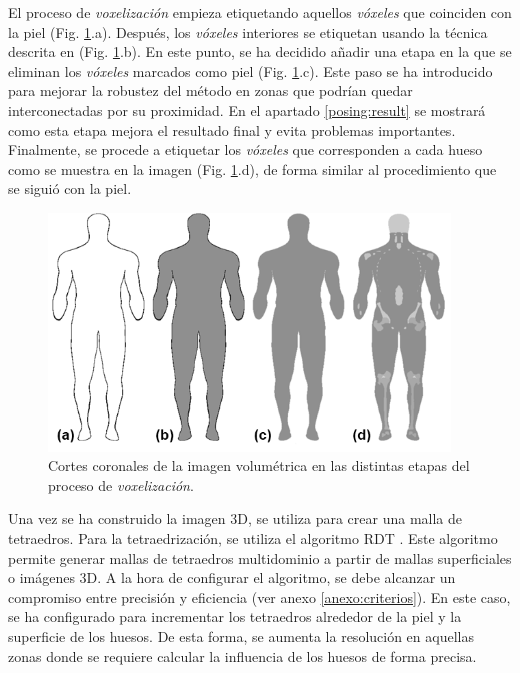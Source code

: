 El proceso de \emph{voxelización} empieza etiquetando aquellos \emph{vóxeles} que coinciden con la piel (Fig. \ref{fig:voxelizacion}.a). Después, los \emph{vóxeles} interiores se etiquetan usando la técnica descrita en \cite{SUZUKI20031} (Fig. \ref{fig:voxelizacion}.b).
En este punto, se ha decidido añadir una etapa en la que se eliminan los \emph{vóxeles} marcados como piel (Fig. \ref{fig:voxelizacion}.c). %
Este paso se ha introducido para mejorar la robustez del método en zonas que podrían quedar interconectadas por su proximidad. 
En el apartado \ref{posing:result} se mostrará como esta etapa mejora el resultado final y evita problemas importantes. Finalmente, se procede a etiquetar los \emph{vóxeles} que corresponden a cada hueso como se muestra en la imagen (Fig. \ref{fig:voxelizacion}.d), de forma similar al procedimiento que se siguió con la piel. 
%
%
\begin{figure}[th]
   \centering
    \includegraphics[width=0.95\textwidth]{IMG/Volume2.png}
    \caption{
    Cortes coronales de la imagen volumétrica en las distintas etapas del proceso de \emph{voxelización}.}
\label{fig:voxelizacion}
\end{figure}

Una vez se ha construido la imagen 3D, se utiliza para crear una malla de tetraedros. Para la tetraedrización, se utiliza el algoritmo  \ac{RDT} \cite{jamin:hal-00796052}. Este algoritmo permite generar mallas de tetraedros multidominio a partir de mallas superficiales o imágenes 3D. A la hora de configurar el algoritmo, se debe alcanzar un compromiso entre precisión y eficiencia (ver anexo \ref{anexo:criterios}). En este caso, se ha configurado para incrementar los tetraedros alrededor de la piel y la superficie de los huesos.  De esta forma, se aumenta la resolución en aquellas zonas donde se requiere calcular la influencia de los huesos de forma precisa.

